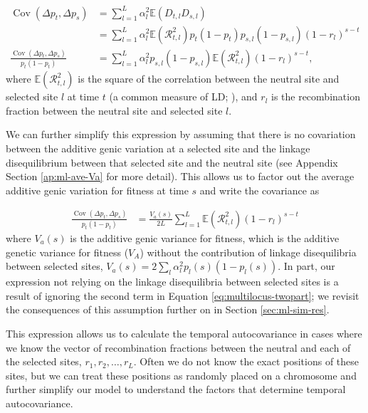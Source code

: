 \documentclass[11pt]{article}
\newcommand{\nnn}{\nonumber}
\newcommand{\E}{\mathbb{E}}
\DeclareMathOperator{\cov}{Cov}
\begin{document}
\begin{subequations}
  \begin{align}
    \cov(\Delta p_t, \Delta p_s) &= \sum_{l=1}^L \alpha_{l}^2 \E(D_{t,l} D_{s,l}) \nnn \\
                                 &= \sum_{l=1}^L \alpha_{l}^2 \E(\mathcal{R}_{t,l}^2) p_t (1-p_t) p_{s,l} (1-p_{s,l}) (1-r_l)^{s-t}  \\
    \frac{\cov(\Delta p_t, \Delta p_s)}{p_t (1-p_t)} &= \sum_{l=1}^L \alpha_{l}^2 p_{s,l} (1-p_{s,l}) \E(\mathcal{R}_{t,l}^2) (1-r_l)^{s-t}, 
  \end{align} 
  \label{eq:cov-R}
\end{subequations}
%
where $\E(\mathcal{R}^2_{t,l})$ is the square of the correlation between the
neutral site and selected site $l$ at time $t$ (a common measure of LD;
\cite{Hill1968-ue}), and $r_l$ is the recombination fraction between the
neutral site and selected site $l$.

We can further simplify this expression by assuming that there is no
covariation between the additive genic variation at a selected site and the
linkage disequilibrium between that selected site and the neutral site (see
Appendix Section \ref{ap:ml-ave-Va} for more detail). This allows us to factor
out the average additive genic variation for fitness at time $s$ and write the
covariance as

\begin{align}
  \frac{\cov(\Delta p_t, \Delta p_s)}{p_t(1-p_t) } &= \frac{V_a(s)}{2L} \sum_{l=1}^L \E(\mathcal{R}_{t,l}^2) (1-r_l)^{s-t}
  \label{eq:multilocus-cov-sum}
\end{align}
%
where $V_a(s)$ is the additive genic variance for fitness, which is the
additive genetic variance for fitness ($V_A$) without the contribution of
linkage disequilibria between selected sites, $V_a(s) = 2 \sum_l \alpha_l^2
p_l(s) (1-p_l(s))$. In part, our expression not relying on the linkage
disequilibria between selected sites is a result of ignoring the second
term in Equation \eqref{eq:multilocus-twopart}; we revisit the consequences of
this assumption further on in Section \ref{sec:ml-sim-res}.

This expression allows us to calculate the temporal autocovariance in cases
where we know the vector of recombination fractions between the neutral and
each of the selected sites, $r_1, r_2, \ldots, r_L$. Often we do not know the
exact positions of these sites, but we can treat these positions as randomly
placed on a chromosome and further simplify our model to understand the factors
that determine temporal autocovariance.
\end{document}
